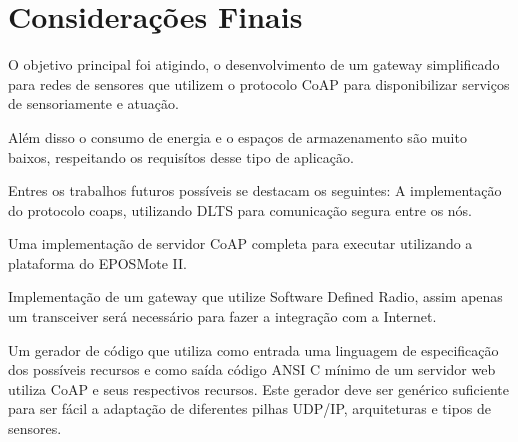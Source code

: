 \section{Considera\c{c}\~oes Finais}

O objetivo principal foi atigindo, o desenvolvimento de um gateway simplificado para redes de sensores que utilizem o protocolo CoAP para disponibilizar servi\c{c}os de sensoriamente e atua\c{c}\~ao.

Al\'em disso o consumo de energia e o espa\c{c}os de armazenamento s\~ao muito baixos, respeitando os requis\'itos desse tipo de aplica\c{c}\~ao.

Entres os trabalhos futuros poss\'iveis se destacam os seguintes:
A implementa\c{c}\~ao do protocolo coaps, utilizando DLTS para comunica\c{c}\~ao segura entre os n\'os.

Uma implementa\c{c}\~ao de servidor CoAP completa para executar utilizando a plataforma do EPOSMote II.

Implementa\c{c}\~ao de um gateway que utilize Software Defined Radio, assim apenas um transceiver ser\'a necess\'ario para
fazer a integra\c{c}\~ao com a Internet.

Um gerador de c\'odigo que utiliza como entrada uma linguagem de especifica\c{c}\~ao dos poss\'iveis recursos e como sa\'ida c\'odigo ANSI C m\'inimo de um servidor web utiliza CoAP e seus respectivos recursos. Este gerador deve ser gen\'erico suficiente para ser f\'acil a adapta\c{c}\~ao de diferentes pilhas UDP/IP, arquiteturas e tipos de sensores.
